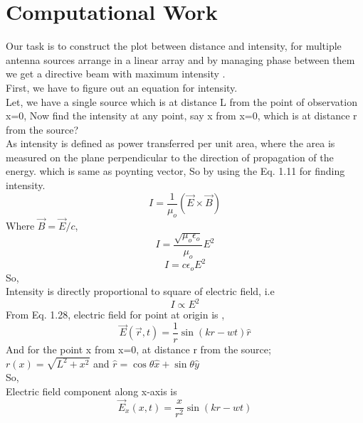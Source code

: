 \documentclass[a4paper, twoside] {thesis}
\begin{document}
\section{Computational Work}
Our task is to construct the plot between distance and intensity, for multiple antenna sources arrange in a linear array and by managing phase between them we get a directive beam with maximum intensity .\\
First, we have to figure out an equation for intensity.\\
Let, we have a single source which is at distance L from the point of observation x=0, Now find the intensity at any point, say x from x=0, which is at distance r from the source?\\
As intensity is defined as power transferred per unit area, where the area is measured on the plane perpendicular to the direction of propagation of the energy. which is same as poynting vector, So by using the Eq. 1.11 for finding intensity.\\
\begin{equation}
I = \frac{1}{\mu_{o}}(\vec{E}\times\vec{B})
\end{equation}
Where $\vec{B} = \vec{E}/c$,\\
\begin{equation}
I = \frac{\sqrt{\mu_{o}{\epsilon_{o}}}}{\mu_{o}}E^2
\end{equation}
\begin{equation}
I = c\epsilon_{o}E^2
\end{equation}
So,\\
Intensity is directly proportional to square of electric field, i.e\\
\begin{equation}
I \varpropto E^2
\end{equation}
From Eq. 1.28, electric field for point at origin is ,\\
\begin{equation}
\vec{E}(\vec{r},t) = \frac{1}{r}\sin(kr-wt)\hat{r}
\end{equation}
And for the point x from x=0, at distance r from the source;\\
$r(x) = \sqrt{L^2+x^2}$ and $\hat{r} = \cos\theta\hat{x}+\sin\theta\hat{y}$\\
So,\\
Electric field component along x-axis is\\
\begin{equation}
\vec{E}_x(x,t) = \frac{x}{r^2}\sin(kr-wt)
\end{equation}
\end{document}
